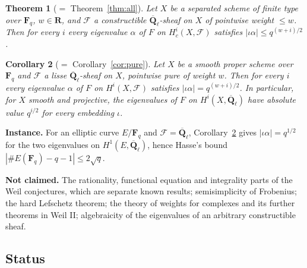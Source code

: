 \documentclass[11pt,a4paper]{article}
\theoremstyle{plain}
\newtheorem{maintheorem}{Theorem}
\newtheorem{maincorollary}[maintheorem]{Corollary}
\theoremstyle{definition}
\theoremstyle{remark}
\newcommand{\Fq}{\mathbf F_q}
\newcommand{\Ql}{\overline{\mathbf Q}_\ell}
\newcommand{\F}{\mathcal F}
\begin{document}
\begin{maintheorem}[$=$ Theorem~\ref{thm:all}]\label{thm:A}
Let $X$ be a separated scheme of finite type over $\Fq$, $w\in\mathbf R$, and $\F$ a constructible $\Ql$-sheaf on $X$ of
pointwise weight $\le w$. Then for every $i$ every eigenvalue $\alpha$ of $F$ on $H^i_c(X,\F)$ satisfies
$|\iota\alpha|\le q^{(w+i)/2}$.
\end{maintheorem}

\begin{maincorollary}[$=$ Corollary~\ref{cor:pure}]\label{cor:B}
Let $X$ be a smooth proper scheme over $\Fq$ and $\F$ a lisse $\Ql$-sheaf on $X$, pointwise pure of weight $w$. Then for
every $i$ every eigenvalue $\alpha$ of $F$ on $H^i(X,\F)$ satisfies $|\iota\alpha|=q^{(w+i)/2}$. In particular, for $X$
smooth and projective, the eigenvalues of $F$ on $H^i(X,\Ql)$ have absolute value $q^{i/2}$ for every embedding $\iota$.
\end{maincorollary}

\noindent\textbf{Instance.} For an elliptic curve $E/\Fq$ and $\F=\Ql$, Corollary~\ref{cor:B} gives $|\iota\alpha|=q^{1/2}$
for the two eigenvalues on $H^1(E,\Ql)$, hence Hasse's bound $|\#E(\Fq)-q-1|\le2\sqrt q$.

\smallskip
\noindent\textbf{Not claimed.} The rationality, functional equation and integrality parts of the Weil conjectures, which
are separate known results; semisimplicity of Frobenius; the hard Lefschetz theorem; the theory of weights for complexes
and its further theorems in Weil II; algebraicity of the eigenvalues of an arbitrary constructible sheaf.

\subsection{Status}
\end{document}
